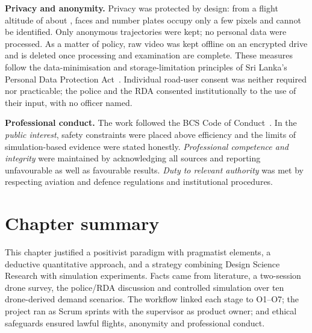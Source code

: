\textbf{Privacy and anonymity.} Privacy was protected by design: from a flight altitude of about , faces and number plates occupy only a few pixels and cannot be identified. Only anonymous trajectories were kept; no personal data were processed. As a matter of policy, raw video was kept offline on an encrypted drive and is deleted once processing and examination are complete. These measures follow the data-minimisation and storage-limitation principles of Sri Lanka's Personal Data Protection Act~\cite{pdpa2022srilanka}. Individual road-user consent was neither required nor practicable; the police and the RDA consented institutionally to the use of their input, with no officer named.

\textbf{Professional conduct.} The work followed the BCS Code of Conduct~\cite{bcs_codeofconduct}. In the \emph{public interest}, safety constraints were placed above efficiency and the limits of simulation-based evidence were stated honestly. \emph{Professional competence and integrity} were maintained by acknowledging all sources and reporting unfavourable as well as favourable results. \emph{Duty to relevant authority} was met by respecting aviation and defence regulations and institutional procedures.

\section{Chapter summary}\label{sec:method-summary}

This chapter justified a positivist paradigm with pragmatist elements, a deductive quantitative approach, and a strategy combining Design Science Research with simulation experiments. Facts came from literature, a two-session drone survey, the police/RDA discussion and controlled simulation over ten drone-derived demand scenarios. The workflow linked each stage to O1--O7; the project ran as Scrum sprints with the supervisor as product owner; and ethical safeguards ensured lawful flights, anonymity and professional conduct.
